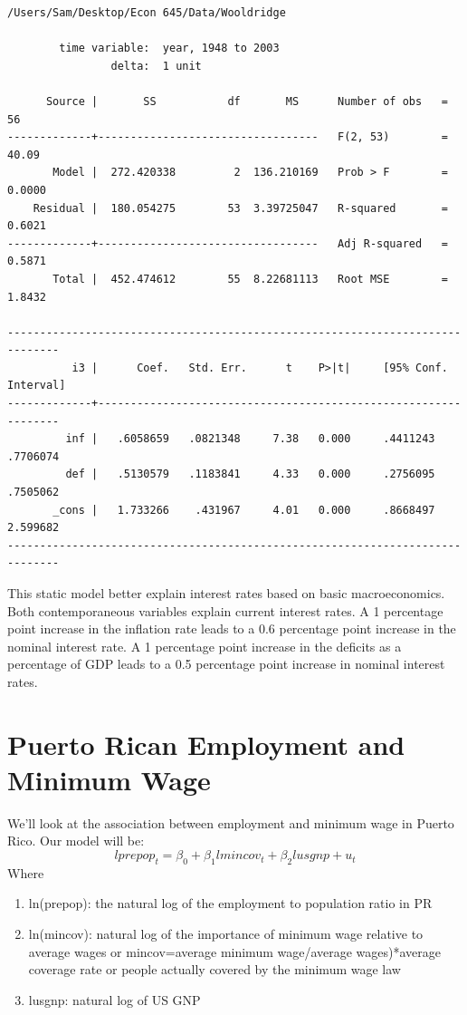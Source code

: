 \documentclass[
]{book}
\providecommand{\tightlist}{%
  \setlength{\itemsep}{0pt}\setlength{\parskip}{0pt}}
\begin{document}
\begin{verbatim}
/Users/Sam/Desktop/Econ 645/Data/Wooldridge

        time variable:  year, 1948 to 2003
                delta:  1 unit

      Source |       SS           df       MS      Number of obs   =        56
-------------+----------------------------------   F(2, 53)        =     40.09
       Model |  272.420338         2  136.210169   Prob > F        =    0.0000
    Residual |  180.054275        53  3.39725047   R-squared       =    0.6021
-------------+----------------------------------   Adj R-squared   =    0.5871
       Total |  452.474612        55  8.22681113   Root MSE        =    1.8432

------------------------------------------------------------------------------
          i3 |      Coef.   Std. Err.      t    P>|t|     [95% Conf. Interval]
-------------+----------------------------------------------------------------
         inf |   .6058659   .0821348     7.38   0.000     .4411243    .7706074
         def |   .5130579   .1183841     4.33   0.000     .2756095    .7505062
       _cons |   1.733266    .431967     4.01   0.000     .8668497    2.599682
------------------------------------------------------------------------------
\end{verbatim}

This static model better explain interest rates based on basic macroeconomics.
Both contemporaneous variables explain current interest rates. A 1 percentage
point increase in the inflation rate leads to a 0.6 percentage point increase
in the nominal interest rate. A 1 percentage point increase in the deficits as
a percentage of GDP leads to a 0.5 percentage point increase in nominal interest
rates.

\section{Puerto Rican Employment and Minimum Wage}\label{puerto-rican-employment-and-minimum-wage}

We'll look at the association between employment and minimum wage in Puerto Rico.
Our model will be:
\[ lprepop_t = \beta_0 + \beta_1 lmincov_t + \beta_2 lusgnp + u_t \]
Where

\begin{enumerate}
\def\labelenumi{\arabic{enumi}.}
\tightlist
\item
  ln(prepop): the natural log of the employment to population ratio in PR
\item
  ln(mincov): natural log of the importance of minimum wage relative to average wages or mincov=average minimum wage/average wages)*average coverage rate or people actually covered by the minimum wage law
\item
  lusgnp: natural log of US GNP
\end{enumerate}
\end{document}
